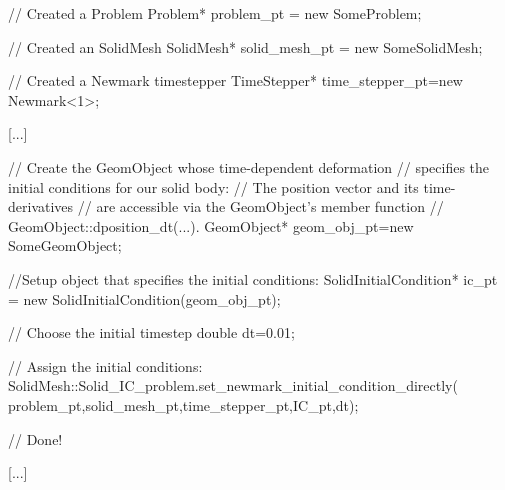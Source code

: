 \begin{DoxyCode}
\textcolor{comment}{// Created a Problem}
Problem* problem\_pt = \textcolor{keyword}{new} SomeProblem;

\textcolor{comment}{// Created an SolidMesh }
SolidMesh* solid\_mesh\_pt = \textcolor{keyword}{new} SomeSolidMesh;

\textcolor{comment}{// Created a Newmark timestepper}
TimeStepper* time\_stepper\_pt=\textcolor{keyword}{new} Newmark<1>; 

[...]

\textcolor{comment}{// Create the GeomObject whose time-dependent deformation }
\textcolor{comment}{// specifies the initial conditions for our solid body:}
\textcolor{comment}{// The position vector and its time-derivatives}
\textcolor{comment}{// are accessible via the GeomObject's member function}
\textcolor{comment}{// GeomObject::dposition\_dt(...).}
GeomObject* geom\_obj\_pt=\textcolor{keyword}{new} SomeGeomObject;

\textcolor{comment}{//Setup object that specifies the initial conditions:}
SolidInitialCondition* ic\_pt = \textcolor{keyword}{new} SolidInitialCondition(geom\_obj\_pt);

\textcolor{comment}{// Choose the initial timestep}
\textcolor{keywordtype}{double} dt=0.01; 

\textcolor{comment}{// Assign the initial conditions:}
SolidMesh::Solid\_IC\_problem.set\_newmark\_initial\_condition\_directly(
             problem\_pt,solid\_mesh\_pt,time\_stepper\_pt,IC\_pt,dt);

\textcolor{comment}{// Done!}

[...]
\end{DoxyCode}


